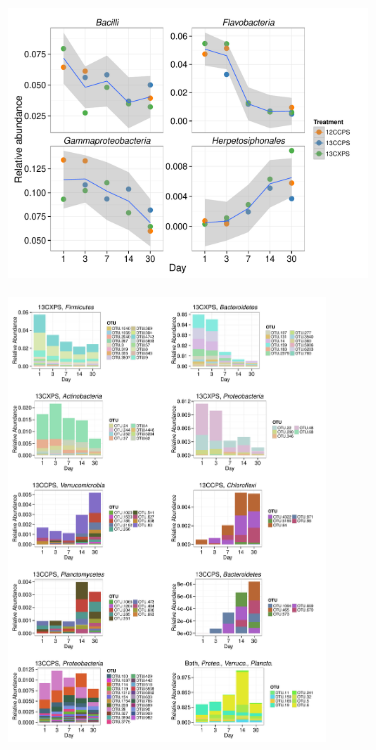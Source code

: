 \begin{figure}[H]
	\begin{center}
    \centerline{\includegraphics[width=0.85\textwidth]{figures/abndVtime_class/abndVtime_class.pdf}}
	\caption[Relative abundance of Classes over time for Classes that changed significantly in abundance with time]{\protect}\label{fig:time_class}
    \end{center}
\end{figure}

\begin{figure}[H]
	\begin{center}
    \centerline{\includegraphics[width=0.75\textwidth]{figures/bulk_phylum_rspndr_abund/abund_v_time_phyla.pdf}}
	\caption{\protect}\label{fig:babund}
        \end{center}
\end{figure}

